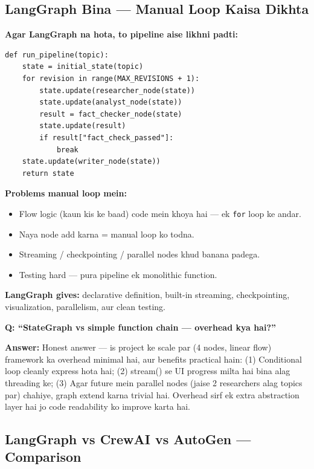 \subsection{LangGraph Bina --- Manual Loop Kaisa Dikhta}

\begin{codestorybox}
\textbf{Agar LangGraph na hota, to pipeline aise likhni padti:}

\begin{lstlisting}[style=pythonstyle, caption={Manual pipeline (no framework)}]
def run_pipeline(topic):
    state = initial_state(topic)
    for revision in range(MAX_REVISIONS + 1):
        state.update(researcher_node(state))
        state.update(analyst_node(state))
        result = fact_checker_node(state)
        state.update(result)
        if result["fact_check_passed"]:
            break
    state.update(writer_node(state))
    return state
\end{lstlisting}

\textbf{Problems manual loop mein:}
\begin{itemize}
\item Flow logic (kaun kis ke baad) code mein khoya hai --- ek \texttt{for} loop ke andar.
\item Naya node add karna = manual loop ko todna.
\item Streaming / checkpointing / parallel nodes khud banana padega.
\item Testing hard --- pura pipeline ek monolithic function.
\end{itemize}

\textbf{LangGraph gives:} declarative definition, built-in streaming, checkpointing, visualization, parallelism, aur clean testing.
\end{codestorybox}

\begin{interviewbox}
\textbf{Q: ``StateGraph vs simple function chain --- overhead kya hai?''}

\textbf{Answer:} Honest answer --- is project ke scale par (4 nodes, linear flow) framework ka overhead minimal hai, aur benefits practical hain: (1) Conditional loop cleanly express hota hai; (2) stream() se UI progress milta hai bina alag threading ke; (3) Agar future mein parallel nodes (jaise 2 researchers alag topics par) chahiye, graph extend karna trivial hai. Overhead sirf ek extra abstraction layer hai jo code readability ko improve karta hai.
\end{interviewbox}

\subsection{LangGraph vs CrewAI vs AutoGen --- Comparison}

